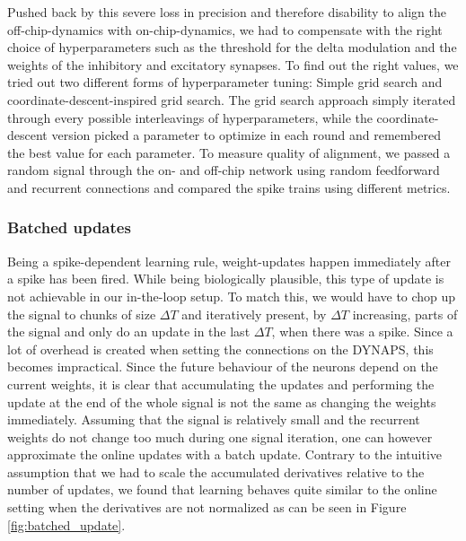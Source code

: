 \documentclass[twoside,11pt]{article}
\begin{document}
Pushed back by this severe loss in precision and therefore disability to align the off-chip-dynamics with 
on-chip-dynamics, we had to compensate with the right choice of hyperparameters such as the threshold
for the delta modulation and the weights of the inhibitory and excitatory synapses.
To find out the right values, we tried out two different forms of hyperparameter tuning: Simple grid
search and coordinate-descent-inspired grid search. The grid search approach simply iterated through every
possible interleavings of hyperparameters, while the coordinate-descent version picked a parameter to optimize
in each round and remembered the best value for each parameter.
To measure quality of alignment, we passed a random signal through the on- and off-chip network using random
feedforward and recurrent connections and compared the spike trains using different metrics.




\subsubsection{Batched updates}

Being a spike-dependent learning rule, weight-updates happen immediately after a spike has been fired.
While being biologically plausible, this type of update is not achievable in our in-the-loop setup.
To match this, we would have to chop up the signal to chunks of size $\Delta T$ and iteratively present,
by $\Delta T$ increasing, parts of the signal and only do an update in the last $\Delta T$, when there 
was a spike. Since a lot of overhead is created when setting the connections on the DYNAPS, this becomes
impractical.
Since the future behaviour of the neurons depend on the current weights, it is clear that accumulating the
updates and performing the update at the end of the whole signal is not the same as changing the weights
immediately. Assuming that the signal is relatively small and the recurrent weights do not change too
much during one signal iteration, one can however approximate the online updates with a batch update.
Contrary to the intuitive assumption that we had to scale the accumulated derivatives relative to the
number of updates, we found that learning behaves quite similar to the online setting when the
derivatives are not normalized as can be seen in Figure \ref{fig:batched_update}.
\end{document}
